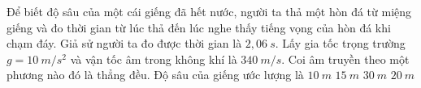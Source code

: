 \begin{vidu}%
Để biết độ sâu của một cái giếng đã hết nước, người ta thả một hòn đá từ miệng giếng và đo thời gian từ lúc thả đến lúc nghe thấy tiếng vọng của hòn đá khi chạm đáy. Giả sử người ta đo được thời gian là $2,06\ s$. Lấy gia tốc trọng trường $g = 10\ m/s^2$ và vận tốc âm trong không khí là $340\ m/s$. Coi âm truyền theo một phương nào đó là thẳng đều. Độ sâu của giếng ước lượng là
\choice
{$10\ m$}
{$15\ m$}
{$30\ m$}
{\True $20\ m$}
 \end{vidu}

